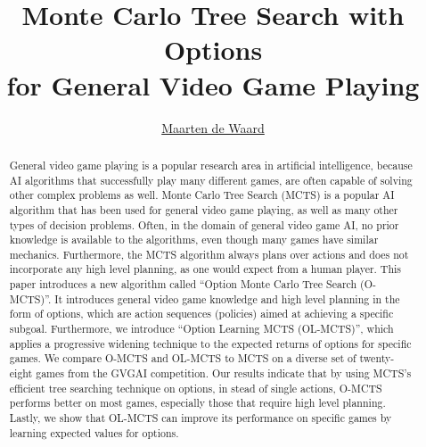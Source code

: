 \documentclass[a4]{report}
\title{Monte Carlo Tree Search with Options\\for General Video Game Playing}
\author{\href{mailto:mrtndwrd@gmail.com}{Maarten de Waard}}
\begin{document}

\maketitle

\begin{abstract}
	General video game playing is a popular research area in artificial
	intelligence, because AI algorithms that successfully play many different
	games, are often capable of solving other complex problems as well.  Monte
	Carlo Tree Search (MCTS) is a popular AI algorithm that has been used for
	general video game playing, as well as many other types of decision
	problems. Often, in the domain of general video game AI, no prior knowledge
	is available to the algorithms, even though many games have similar
	mechanics. Furthermore, the MCTS algorithm always plans over actions and
	does not incorporate any high level planning, as one would expect from a
	human player. This paper introduces a new algorithm called ``Option Monte
	Carlo Tree Search (O-MCTS)''. It introduces general video game knowledge and
	high level planning in the form of options, which are action sequences
	(policies) aimed at achieving a specific subgoal. Furthermore, we introduce
	``Option Learning MCTS (OL-MCTS)'', which applies a progressive widening
	technique to the expected returns of options for specific games.  We compare
	O-MCTS and OL-MCTS to MCTS on a diverse set of twenty-eight games from the
	GVGAI competition. Our results indicate that by using MCTS's efficient tree
	searching technique on options, in stead of single actions, O-MCTS performs
	better on most games, especially those that require high level planning.
Lastly, we show that OL-MCTS can improve its performance on specific games by
learning expected values for options.  \end{abstract}

\tableofcontents




















\end{document}
